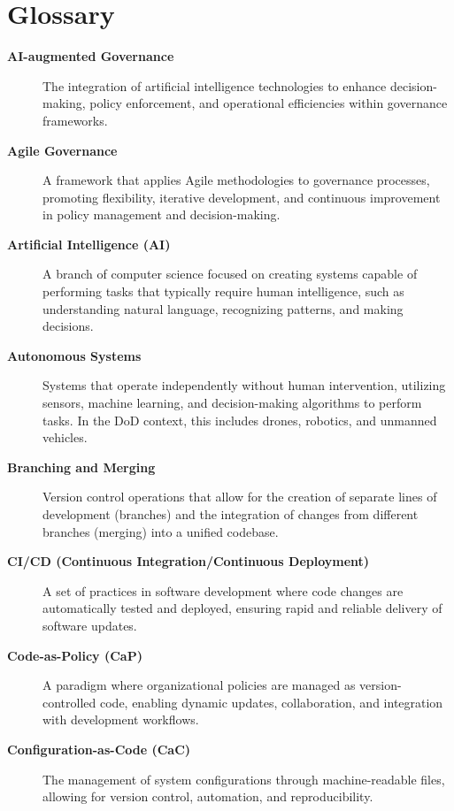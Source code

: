\documentclass[11pt]{article}
\begin{document}
\section{Glossary}
\begin{description}

    \item[\textbf{AI-augmented Governance}]
    The integration of artificial intelligence technologies to enhance decision-making, policy enforcement, and operational efficiencies within governance frameworks.

    \item[\textbf{Agile Governance}]
    A framework that applies Agile methodologies to governance processes, promoting flexibility, iterative development, and continuous improvement in policy management and decision-making.

    \item[\textbf{Artificial Intelligence (AI)}]
    A branch of computer science focused on creating systems capable of performing tasks that typically require human intelligence, such as understanding natural language, recognizing patterns, and making decisions.

    \item[\textbf{Autonomous Systems}]
    Systems that operate independently without human intervention, utilizing sensors, machine learning, and decision-making algorithms to perform tasks. In the DoD context, this includes drones, robotics, and unmanned vehicles.

    \item[\textbf{Branching and Merging}]
    Version control operations that allow for the creation of separate lines of development (branches) and the integration of changes from different branches (merging) into a unified codebase.

    \item[\textbf{CI/CD (Continuous Integration/Continuous Deployment)}]
    A set of practices in software development where code changes are automatically tested and deployed, ensuring rapid and reliable delivery of software updates.

    \item[\textbf{Code-as-Policy (CaP)}]
    A paradigm where organizational policies are managed as version-controlled code, enabling dynamic updates, collaboration, and integration with development workflows.

    \item[\textbf{Configuration-as-Code (CaC)}]
    The management of system configurations through machine-readable files, allowing for version control, automation, and reproducibility.


\end{description}
\end{document}
